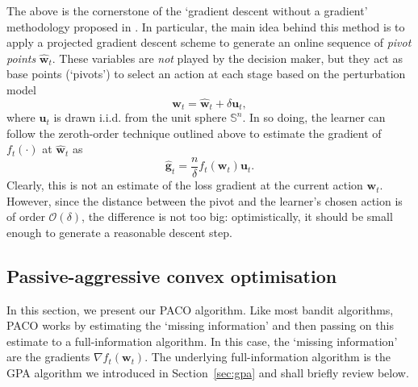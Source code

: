 The above is the cornerstone of the `gradient descent without a gradient' methodology proposed in \citep{flaxman05}. In particular, the main idea behind this method is to apply a projected gradient descent scheme to generate an online sequence of \emph{pivot points} $\widehat{\mathbf{w}}_t$. These variables are \emph{not} played by the decision maker, but they act as base points (`pivots') to select an action at each stage based on the perturbation model
\begin{equation}
\label{eq:paco-perturbation-model}
	\mathbf{w}_t
	= \widehat{\mathbf{w}}_t + \delta\mathbf{u}_t,
\end{equation}
where $\mathbf{u}_t$ is drawn i.i.d. from the unit sphere $\mathbb{S}^n$. In so doing, the learner can follow the zeroth-order technique outlined above to estimate the gradient of $f_t(\cdot)$ at $\widehat{\mathbf{w}}_t$ as
\begin{equation}
\label{eq:paco-gradient-estimate}
	\widehat{\mathbf{g}}_t
	= \frac{n}{\delta}f_t(\mathbf{w}_t)\mathbf{u}_t.
\end{equation}
Clearly, this is not an estimate of the loss gradient at the current action $\mathbf{w}_t$. However, since the distance between the pivot and the learner's chosen action is of order $\mathcal{O}(\delta)$, the difference is not too big: optimistically, it should be small enough to generate a reasonable descent step.

\subsection{Passive-aggressive convex optimisation}

In this section, we present our PACO algorithm. Like most bandit algorithms, PACO works by estimating the `missing information' and then passing on this estimate to a full-information algorithm. In this case, the `missing information' are the gradients $\nabla f_t(\mathbf{w}_t)$. The underlying full-information algorithm is the GPA algorithm we introduced in Section~\ref{sec:gpa} and shall briefly review below.

